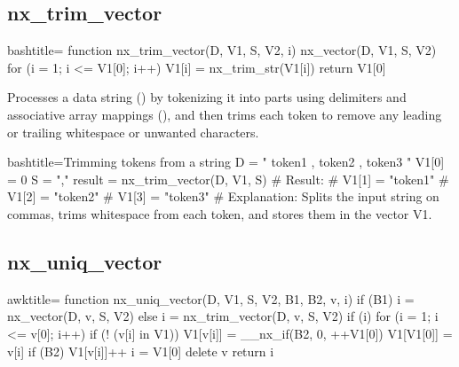 \newpage
\subsection{nx_trim_vector}
\label{nx_trim_vector}
\begin{NexCodeBox}{bash}{title={}}
function nx_trim_vector(D, V1, S, V2,   i)
{
	nx_vector(D, V1, S, V2)
	for (i = 1; i <= V1[0]; i++)
		V1[i] = nx_trim_str(V1[i])
	return V1[0]
}
\end{NexCodeBox}

\begin{NexMainBox}
	\begin{NexMainBox}
		Processes a data string () by tokenizing it into parts using delimiters and associative array mappings (), and then trims each token to remove any leading or trailing whitespace or unwanted characters.
	\end{NexMainBox}
	\begin{NexMainBox}
		\begin{NexListDark}
		\end{NexListDark}
	\end{NexMainBox}
\end{NexMainBox}

\begin{NexCodeBox}{bash}{title={Trimming tokens from a string}}
	D = "  token1 ,  token2 ,  token3  "
	V1[0] = 0
	S = ","
	result = nx_trim_vector(D, V1, S)
	# Result:
	# V1[1] = "token1"
	# V1[2] = "token2"
	# V1[3] = "token3"
	# Explanation: Splits the input string on commas, trims whitespace from each token, and stores them in the vector V1.
\end{NexCodeBox}

\newpage
\subsection{nx_uniq_vector}
\label{nx_uniq_vector}
\begin{NexCodeBox}{awk}{title={}}
function nx_uniq_vector(D, V1, S, V2, B1, B2, v, i) {
	if (B1)
		i = nx_vector(D, v, S, V2)
	else
		i = nx_trim_vector(D, v, S, V2)
	if (i) {
		for (i = 1; i <= v[0]; i++) {
			if (! (v[i] in V1)) {
				V1[v[i]] = __nx_if(B2, 0, ++V1[0])
				V1[V1[0]] = v[i]
			}
			if (B2)
				V1[v[i]]++
		}
		i = V1[0]
	}
	delete v
	return i
}
\end{NexCodeBox}

